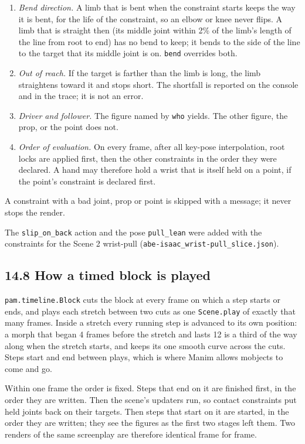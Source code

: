 \documentclass[
  12pt,
  letterpaper,
]{book}
\providecommand{\tightlist}{%
  \setlength{\itemsep}{0pt}\setlength{\parskip}{0pt}}
\begin{document}
\begin{enumerate}
\tightlist
\item
  \emph{Bend direction.} A limb that is bent when the constraint starts
  keeps the way it is bent, for the life of the constraint, so an elbow
  or knee never flips. A limb that is straight then (its middle joint
  within 2\% of the limb's length of the line from root to end) has no
  bend to keep; it bends to the side of the line to the target that its
  middle joint is on. \texttt{bend} overrides both.
\item
  \emph{Out of reach.} If the target is farther than the limb is long,
  the limb straightens toward it and stops short. The shortfall is
  reported on the console and in the trace; it is not an error.
\item
  \emph{Driver and follower.} The figure named by \texttt{who} yields.
  The other figure, the prop, or the point does not.
\item
  \emph{Order of evaluation.} On every frame, after all key-pose
  interpolation, root locks are applied first, then the other
  constraints in the order they were declared. A hand may therefore
  hold a wrist that is itself held on a point, if the point's
  constraint is declared first.
\end{enumerate}

A constraint with a bad joint, prop or point is skipped with a message;
it never stops the render.

The \texttt{slip\_on\_back} action and the pose \texttt{pull\_lean}
were added with the constraints for the Scene 2 wrist-pull
(\texttt{abe-isaac\_wrist-pull\_slice.json}).

\subsection{14.8 How a timed block is played}\label{how-a-timed-block-is-played}

\texttt{pam.timeline.Block} cuts the block at every frame on which a
step starts or ends, and plays each stretch between two cuts as one
\texttt{Scene.play} of exactly that many frames. Inside a stretch every
running step is advanced to its own position: a morph that began 4
frames before the stretch and lasts 12 is a third of the way along when
the stretch starts, and keeps its one smooth curve across the cuts.
Steps start and end between plays, which is where Manim allows mobjects
to come and go.

Within one frame the order is fixed. Steps that end on it are finished
first, in the order they are written. Then the scene's updaters run, so
contact constraints put held joints back on their targets. Then steps
that start on it are started, in the order they are written; they see
the figures as the first two stages left them. Two renders of the same
screenplay are therefore identical frame for frame.
\end{document}

